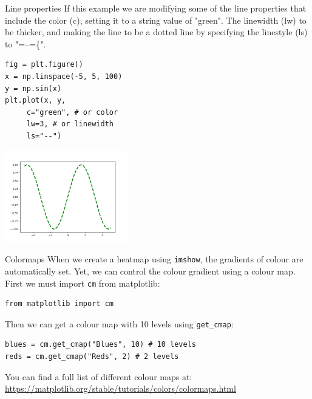 \documentclass[10pt]{beamer}
\begin{document}
\begin{frame}[label={sec:org71d7877},fragile]{Line properties}
 If this example we are modifying some of the line properties that include the
color (c), setting it to a string value of "green". The linewidth (lw) to be
thicker, and making the line to be a dotted line by specifying the linestyle
(ls) to "=--=\{".

\begin{verbatim}
fig = plt.figure()
x = np.linspace(-5, 5, 100)
y = np.sin(x)
plt.plot(x, y,
	 c="green", # or color
	 lw=3, # or linewidth
	 ls="--")
\end{verbatim}

\begin{center}
\includegraphics[width=0.4\textwidth]{images/linestyles.png}
\end{center}
\end{frame}

\begin{frame}[label={sec:orgc4f85b4},fragile]{Colormaps}
 When we create a heatmap using \texttt{imshow}, the gradients of colour are automatically
set. Yet, we can control the colour gradient using a colour map. First we must
import \texttt{cm} from matplotlib:

\begin{verbatim}
from matplotlib import cm
\end{verbatim}

Then we can get a colour map with 10 levels using \texttt{get\_cmap}:

\begin{verbatim}
blues = cm.get_cmap("Blues", 10) # 10 levels
reds = cm.get_cmap("Reds", 2) # 2 levels
\end{verbatim}

You can find a full list of different colour maps at: \url{https://matplotlib.org/stable/tutorials/colors/colormaps.html}
\end{frame}
\end{document}
